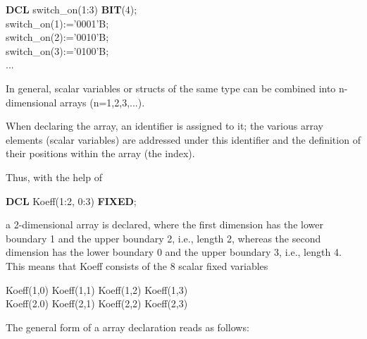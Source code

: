 {\bf DCL} switch\_on(1:3) {\bf BIT}(4);\\
switch\_on(1):='0001'B;\\
switch\_on(2):='0010'B;\\
switch\_on(3):='0100'B;\\
...


In general, scalar variables
 or structs
of the same type can be combined into
n-dimensional arrays (n=1,2,3,...).

When declaring the array, an identifier is assigned to it; the various
array elements (scalar variables) are addressed under this identifier
and the definition of their positions within the array (the index).

Thus, with the help of

{\bf DCL} Koeff(1:2, 0:3) {\bf FIXED};

a 2-dimensional array is declared, where the first dimension has the
lower boundary 1 and the upper boundary 2, i.e., length 2, whereas the
second dimension has the lower boundary 0 and the upper boundary 3,
i.e., length 4.  This means that Koeff consists of the 8 scalar fixed
variables

Koeff(1,0) \x  Koeff(1,1) \x  Koeff(1,2) \x  Koeff(1,3) \\
Koeff(2.0) \x  Koeff(2,1) \x  Koeff(2,2) \x  Koeff(2,3)

The general form of a array declaration reads as follows:

 





